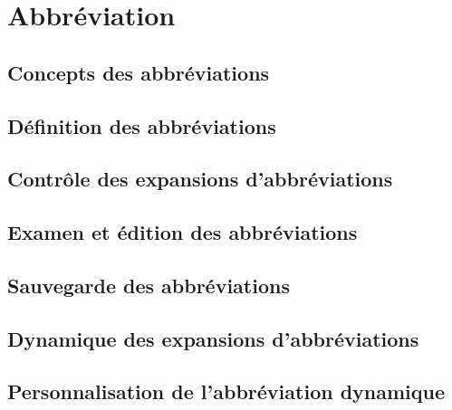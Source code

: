 \chapter{Abbréviation}\label{chap26}
\section{Concepts des abbréviations}\label{chap26sec1}
\section{Définition des abbréviations}\label{chap26sec2}
\section{Contrôle des expansions d'abbréviations}\label{chap26sec3}
\section{Examen et édition des abbréviations}\label{chap26sec4}
\section{Sauvegarde des abbréviations}\label{chap26sec5}
\section{Dynamique des expansions d'abbréviations}\label{chap26sec6}
\section{Personnalisation de l'abbréviation dynamique}\label{chap26sec7}